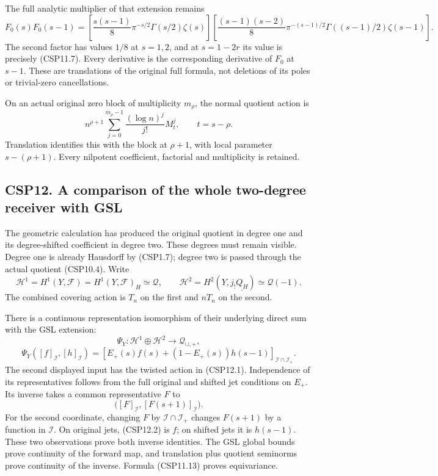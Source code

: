 The full analytic multiplier of that extension remains \[
F_0(s)F_0(s-1)=
\left[\frac{s(s-1)}8\pi^{-s/2}\Gamma(s/2)\zeta(s)\right]
\left[\frac{(s-1)(s-2)}8\pi^{-(s-1)/2}
\Gamma((s-1)/2)\zeta(s-1)\right].
\tag{CSP11.14}
\] The second factor has values \(1/8\) at \(s=1,2\), and at \(s=1-2r\)
its value is precisely (CSP11.7). Every derivative is the corresponding
derivative of \(F_0\) at \(s-1\). These are translations of the original
full formula, not deletions of its poles or trivial-zero cancellations.

On an actual original zero block of multiplicity \(m_\rho\), the normal
quotient action is \[
n^{\rho+1}
\sum_{j=0}^{m_\rho-1}\frac{(\log n)^j}{j!}M_t^j,
\qquad t=s-\rho.
\tag{CSP11.15}
\] Translation identifies this with the block at \(\rho+1\), with local
parameter \(s-(\rho+1)\). Every nilpotent coefficient, factorial and
multiplicity is retained.

\subsection{CSP12. A comparison of the whole two-degree receiver with
GSL}\label{csp12.-a-comparison-of-the-whole-two-degree-receiver-with-gsl}

The geometric calculation has produced the original quotient in degree
one and its degree-shifted coefficient in degree two. These degrees must
remain visible. Degree one is already Hausdorff by (CSP1.7); degree two
is passed through the actual quotient (CSP10.4). Write \[
\mathcal H^1=H^1(Y,\mathscr F)=H^1(Y,\mathscr F)_H\simeq\mathcal Q,\qquad
\mathcal H^2=H^2(Y,j_!\underline{Q_H})\simeq\mathcal Q(-1).
\tag{CSP12.1}
\] The combined covering action is \(T_n\) on the first and \(nT_n\) on
the second.

There is a continuous representation isomorphism of their underlying
direct sum with the GSL extension: \[
\Psi_Y:\mathcal H^1\oplus\mathcal H^2
\longrightarrow\mathcal Q_{\cup,+},
\] \[
\Psi_Y([f]_{\mathcal I},[h]_{\mathcal I})
=[E_+(s)f(s)+(1-E_+(s))h(s-1)]_{\mathcal I\cap\mathcal I_+}.
\tag{CSP12.2}
\] The second displayed input has the twisted action in (CSP12.1).
Independence of its representatives follows from the full original and
shifted jet conditions on \(E_+\). Its inverse takes a common
representative \(F\) to \[
\bigl([F]_{\mathcal I},[F(s+1)]_{\mathcal I}\bigr).
\tag{CSP12.3}
\] For the second coordinate, changing \(F\) by
\(\mathcal I\cap\mathcal I_+\) changes \(F(s+1)\) by a function in
\(\mathcal I\). On original jets, (CSP12.2) is \(f\); on shifted jets it
is \(h(s-1)\). These two observations prove both inverse identities. The
GSL global bounds prove continuity of the forward map, and translation
plus quotient seminorms prove continuity of the inverse. Formula
(CSP11.13) proves equivariance.

